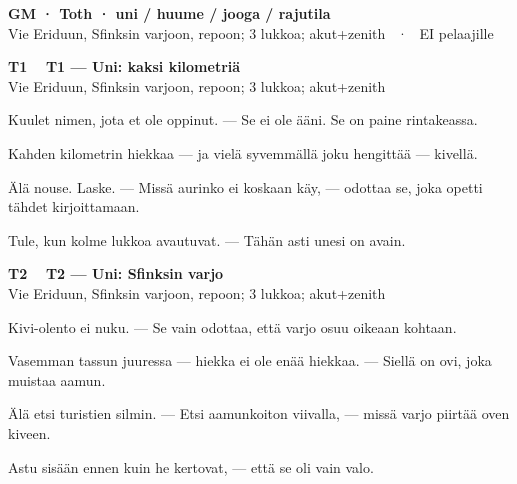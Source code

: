 \documentclass[a4paper,11pt]{article}
\begin{document}
\begin{center}
{\Large\bfseries GM · Toth · uni / huume / jooga / rajutila}\\[0.1em]
{\small Vie Eriduun, Sfinksin varjoon, repoon; 3 lukkoa; akut+zenith \ · \ EI pelaajille}
\end{center}
\vspace{0.8mm}

\noindent
\begin{tcolorbox}[
  colframe=tothcol,
  colback=white,
  boxrule=0.8pt,
  arc=0pt,
  outer arc=0pt,
  left=2.5mm, right=2.5mm, top=2mm, bottom=2mm,
  boxsep=0.5mm,
  sharp corners,
  enhanced,
  breakable=false
]
{\large\ttfamily\bfseries T1}~~
{\normalsize\bfseries T1 --- Uni: kaksi kilometriä}\\[0.2em]
{\small\color{black!65} Vie Eriduun, Sfinksin varjoon, repoon; 3 lukkoa; akut+zenith}\\[0.35em]
{\normalsize\raggedright Kuulet nimen, jota et ole oppinut. --- Se ei ole ääni. Se on paine rintakeassa.

Kahden kilometrin hiekkaa --- ja vielä syvemmällä joku hengittää --- kivellä.

Älä nouse. Laske. --- Missä aurinko ei koskaan käy, --- odottaa se, joka opetti tähdet kirjoittamaan.

Tule, kun kolme lukkoa avautuvat. --- Tähän asti unesi on avain.}
\end{tcolorbox}

\filbreak
\vspace{0.9mm}
\noindent
\begin{tcolorbox}[
  colframe=tothcol,
  colback=white,
  boxrule=0.8pt,
  arc=0pt,
  outer arc=0pt,
  left=2.5mm, right=2.5mm, top=2mm, bottom=2mm,
  boxsep=0.5mm,
  sharp corners,
  enhanced,
  breakable=false
]
{\large\ttfamily\bfseries T2}~~
{\normalsize\bfseries T2 --- Uni: Sfinksin varjo}\\[0.2em]
{\small\color{black!65} Vie Eriduun, Sfinksin varjoon, repoon; 3 lukkoa; akut+zenith}\\[0.35em]
{\normalsize\raggedright Kivi-olento ei nuku. --- Se vain odottaa, että varjo osuu oikeaan kohtaan.

Vasemman tassun juuressa --- hiekka ei ole enää hiekkaa. --- Siellä on ovi, joka muistaa aamun.

Älä etsi turistien silmin. --- Etsi aamunkoiton viivalla, --- missä varjo piirtää oven kiveen.

Astu sisään ennen kuin he kertovat, --- että se oli vain valo.}
\end{tcolorbox}
\end{document}
